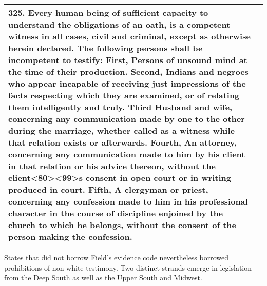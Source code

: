 \documentclass[12pt,]{article}
\begin{document}
\begin{longtable}[]{@{}ll@{}}
\begin{minipage}[t]{0.74\columnwidth}
325. Every human being of sufficient capacity to understand the
obligations of an oath, is a competent witness in all cases, civil and
criminal, except as otherwise herein declared. The following persons
shall be incompetent to testify: First, Persons of unsound mind at the
time of their production. Second, Indians and negroes who appear
incapable of receiving just impressions of the facts respecting which
they are examined, or of relating them intelligently and truly. Third
Husband and wife, concerning any communication made by one to the other
during the marriage, whether called as a witness while that relation
exists or afterwards. Fourth, An attorney, concerning any communication
made to him by his client in that relation or his advice thereon,
without the client\textless80\textgreater\textless99\textgreater s
consent in open court or in writing produced in court. Fifth, A
clergyman or priest, concerning any confession made to him in his
professional character in the course of discipline enjoined by the
church to which he belongs, without the consent of the person making the
confession.\strut
\end{minipage}\tabularnewline
\bottomrule
\end{longtable}

States that did not borrow Field's evidence code nevertheless borrowed
prohibitions of non-white testimony. Two distinct strands emerge in
legislation from the Deep South as well as the Upper South and Midwest.
\end{document}
